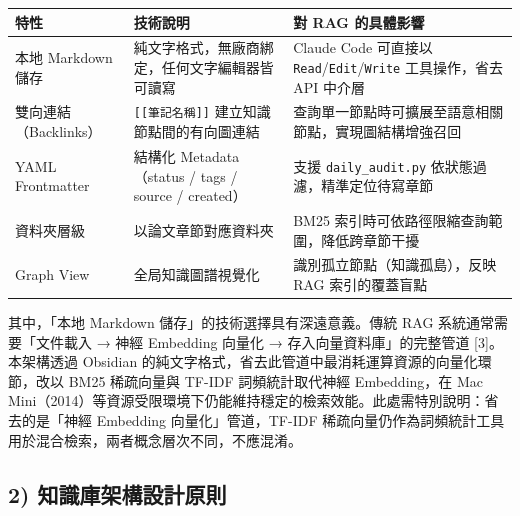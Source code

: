 {\def\LTcaptype{none} %
\begin{longtable}[]{@{}
  >{\raggedright\arraybackslash}p{}
  >{\raggedright\arraybackslash}p{}
  >{\raggedright\arraybackslash}p{}@{}}
\toprule\noalign{}
\begin{minipage}[b]{\linewidth}\raggedright
特性
\end{minipage} & \begin{minipage}[b]{\linewidth}\raggedright
技術說明
\end{minipage} & \begin{minipage}[b]{\linewidth}\raggedright
對 RAG 的具體影響
\end{minipage} \\
\midrule\noalign{}
\endhead
\bottomrule\noalign{}
\endlastfoot
本地 Markdown 儲存 & 純文字格式，無廠商綁定，任何文字編輯器皆可讀寫 &
Claude Code 可直接以 \texttt{Read}/\texttt{Edit}/\texttt{Write}
工具操作，省去 API 中介層 \\
雙向連結（Backlinks） & \texttt{{[}{[}筆記名稱{]}{]}}
建立知識節點間的有向圖連結 &
查詢單一節點時可擴展至語意相關節點，實現圖結構增強召回 \\
YAML Frontmatter & 結構化 Metadata（status / tags / source / created） &
支援 \texttt{daily\_audit.py} 依狀態過濾，精準定位待寫章節 \\
資料夾層級 & 以論文章節對應資料夾 & BM25
索引時可依路徑限縮查詢範圍，降低跨章節干擾 \\
Graph View & 全局知識圖譜視覺化 & 識別孤立節點（知識孤島），反映 RAG
索引的覆蓋盲點 \\
\end{longtable}
}

其中，「本地 Markdown 儲存」的技術選擇具有深遠意義。傳統 RAG
系統通常需要「文件載入 → 神經 Embedding 向量化 →
存入向量資料庫」的完整管道 {[}3{]}。本架構透過 Obsidian
的純文字格式，省去此管道中最消耗運算資源的向量化環節，改以 BM25
稀疏向量與 TF-IDF 詞頻統計取代神經 Embedding，在 Mac
Mini（2014）等資源受限環境下仍能維持穩定的檢索效能。此處需特別說明：省去的是「神經
Embedding 向量化」管道，TF-IDF
稀疏向量仍作為詞頻統計工具用於混合檢索，兩者概念層次不同，不應混淆。

\subsection{2)
知識庫架構設計原則}\label{ux77e5ux8b58ux5eabux67b6ux69cbux8a2dux8a08ux539fux5247}


